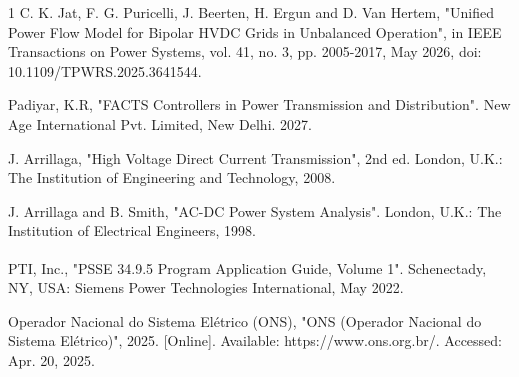 \documentclass[letterpaper,journal]{IEEEtran}
\begin{document}
\begin{thebibliography}{1}
	C. K. Jat, F. G. Puricelli, J. Beerten, H. Ergun and D. Van Hertem, "Unified Power Flow Model for Bipolar HVDC Grids in Unbalanced Operation", in IEEE Transactions on Power Systems, vol. 41, no. 3, pp. 2005-2017, May 2026, doi: 10.1109/TPWRS.2025.3641544.

	Padiyar, K.R, "FACTS Controllers in Power Transmission and Distribution". New Age International Pvt. Limited, New Delhi. 2027.

	J. Arrillaga, "High Voltage Direct Current Transmission", 2nd ed. London, U.K.: The Institution of Engineering and Technology, 2008.

	J. Arrillaga and B. Smith, "AC-DC Power System Analysis". London, U.K.: The Institution of Electrical Engineers, 1998.

	PTI, Inc., "PSS\textsuperscript{\textregistered}E 34.9.5 Program Application Guide, Volume 1". Schenectady, NY, USA: Siemens Power Technologies International, May 2022.

	Operador Nacional do Sistema Elétrico (ONS), "ONS (Operador Nacional do Sistema Elétrico)", 2025. [Online]. Available: https://www.ons.org.br/. Accessed: Apr. 20, 2025.

\end{thebibliography}
\endgroup
\end{document}
